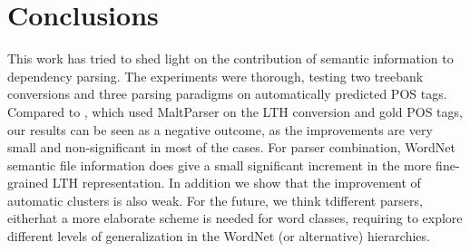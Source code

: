 \documentclass[11pt]{article}
\begin{document}
\section{Conclusions}\label{conclusions}
This work has tried to shed light on the contribution of semantic information to 
dependency parsing. The experiments were thorough, testing two treebank conversions and three 
parsing paradigms on automatically predicted POS tags. Compared to \cite{agirre-EtAl:2011:ACL-HLT2011}, 
which used MaltParser on the LTH conversion and gold POS tags, our 
results can be seen as a negative outcome, as the improvements are very small and non-significant in most of 
the cases. For parser combination, WordNet semantic file information does give a small significant increment 
in the more fine-grained LTH representation. In addition we show that the improvement of automatic clusters 
is also weak. For the future, we think tdifferent parsers, eitherhat a more elaborate scheme is needed for word classes, requiring 
to explore different levels of generalization in the WordNet (or alternative) hierarchies. %


\end{document}
